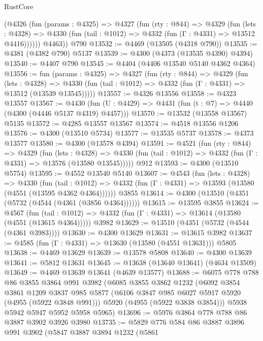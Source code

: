 \begin{lexlean}{RustCore}
\begin{coremodule}
        (@4326
          (fun (params : @4325) =>
          @4327
            (fun (rty : @844) =>
            @4329
              (fun (lets : @4328) =>
              @4330 (fun (tail : @1012) => @4332 (fun (Γ : @4331) => @13512 @4416))))))
        @4463))
    @790
@13532 := @4469 (@13505 (@4318 @790))
@13535 := @4381 (@4382 @790) @5137
@13539 := @4300 (@4373 (@13535 @4390) @4394)
@13540 := @4407 @790
@13545 := @4404 (@4406 @13540 @5140 @4362 @4364)
@13556 := fun (params : @4325) =>
  @4327
    (fun (rty : @844) =>
    @4329
      (fun (lets : @4328) =>
      @4330 (fun (tail : @1012) => @4332 (fun (Γ : @4331) => @13512 (@13539 @13545)))))
@13557 := @4326 @13556
@13558 := @4323 @13557
@13567 := @4430 (fun (U : @4429) => @4431 (fun (t : @7) => @4440 (@4300 (@4446 @5137 @4319) @4457)))
@13570 := @13532 (@13558 @13567) @5135
@13572 := @4285 @13557 @13567
@13574 := @4518 @13556 @1206
@13576 := @4300 (@13510 @5734)
@13577 := @13535 @5737
@13578 := @4373 @13577
@13580 := @4300 (@13578 @4394)
@13591 := @4521
    (fun (rty : @844) =>
    @4329
      (fun (lets : @4328) =>
      @4330 (fun (tail : @1012) => @4332 (fun (Γ : @4331) => @13576 (@13580 @13545)))))
    @912
@13593 := @4300 (@13510 @5754)
@13595 := @4552 @13540 @5140
@13607 := @4543
    (fun (lets : @4328) =>
    @4330
      (fun (tail : @1012) =>
      @4332 (fun (Γ : @4331) => @13593 (@13580 (@4551 (@13595 @4362 @4364))))))
    @3855
@13614 := @4300 (@13510 (@4351 (@5732 (@4544 (@4361 (@3856 @4364))))))
@13615 := @13595 @3855
@13624 := @4567
    (fun (tail : @1012) => @4332 (fun (Γ : @4331) => @13614 (@13580 (@4551 (@13615 @4364)))))
    @3982
@13629 := @13510 (@4351 (@5732 (@4544 (@4361 @3983))))
@13630 := @4300 @13629
@13631 := @13615 @3982
@13637 := @4585 (fun (Γ : @4331) => @13630 (@13580 (@4551 @13631))) @5805
@13638 := @4469 @13629
@13639 := @13578 @5808
@13640 := @4300 @13639
@13641 := @5812 @13631
@13645 := @13638 (@13640 @13641) (@4634 @13509)
@13649 := @4469 @13639 @13641 (@4639 @13577)
@13688 := @6075
    @778
    @788
    @86
    @3855
    @3864
    @991
    @3982
    (@6085
      @3855
      @3862
      @1232
      (@6092
        @3854
        @3861
        @1209
        @3837
        @985
        @5877
        (@6106 @3847 @985 @6027 @5917 @5920 (@4955 (@5922 @3848 @991)))
        @5920
        (@4955 (@5922 @3838 @3854)))
      @5938
      @5942
      @5947
      @5952
      @5958
      @5965)
@13696 := @5976 @3864 @778 @788 @86 @3887 @3902 @3926 @3980
@13735 := @5829
    @776
    @584
    @86
    @3887
    @3896
    @991
    @3902
    (@5847
      @3887
      @3894
      @1232
      (@5861

\end{coremodule}
\end{lexlean}
